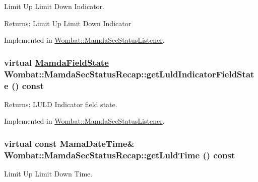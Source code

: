 Limit Up Limit Down Indicator. 

\begin{Desc}
\item[Returns:]Limit Up Limit Down Indicator \end{Desc}


Implemented in \hyperlink{classWombat_1_1MamdaSecStatusListener_eee57407b1b230ed6886469a56007980}{Wombat::Mamda\-Sec\-Status\-Listener}.\hypertarget{classWombat_1_1MamdaSecStatusRecap_cd0efb75dca37116bc753835ac720b01}{
\subsubsection[getLuldIndicatorFieldState]{\setlength{\rightskip}{0pt plus 5cm}virtual \hyperlink{namespaceWombat_93aac974f2ab713554fd12a1fa3b7d2a}{Mamda\-Field\-State} Wombat::Mamda\-Sec\-Status\-Recap::get\-Luld\-Indicator\-Field\-State () const}}
\label{classWombat_1_1MamdaSecStatusRecap_cd0efb75dca37116bc753835ac720b01}


\begin{Desc}
\item[Returns:]LULD Indicator field state. \end{Desc}


Implemented in \hyperlink{classWombat_1_1MamdaSecStatusListener_1e65d16674a50306ed0c455e9b1c7dcd}{Wombat::Mamda\-Sec\-Status\-Listener}.\hypertarget{classWombat_1_1MamdaSecStatusRecap_b53e48f73896500f5f752c6ee5d51a0c}{
\subsubsection[getLuldTime]{\setlength{\rightskip}{0pt plus 5cm}virtual const Mama\-Date\-Time\& Wombat::Mamda\-Sec\-Status\-Recap::get\-Luld\-Time () const}}
\label{classWombat_1_1MamdaSecStatusRecap_b53e48f73896500f5f752c6ee5d51a0c}


Limit Up Limit Down Time. 

